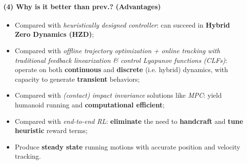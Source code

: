 \documentclass{article}
\begin{document}
\paragraph{(4) Why is it better than prev.? (Advantages)} 
\begin{itemize}
  \item Compared with \textit{heuristically designed controller}: can succeed in \textbf{Hybrid Zero Dynamics (HZD)};
  \item Compared with \textit{offline trajectory optimization + online tracking with traditional feedback linearization \& control Lyapunov functions (CLFs)}: operate on both \textbf{continuous} and \textbf{discrete} (i.e. hybrid) dynamics, with capacity to generate \textbf{transient} behaviors;
  \item Compared with \textit{(contact) impact invariance} solutions like \textit{MPC}: yield humanoid running and \textbf{computational efficient};
  \item Compared with \textit{end-to-end RL}: \textbf{eliminate} the need to \textbf{handcraft} and \textbf{tune heuristic} reward terms;
  \item Produce \textbf{steady state} running motions with accurate position and velocity tracking.
\end{itemize}
\end{document}
